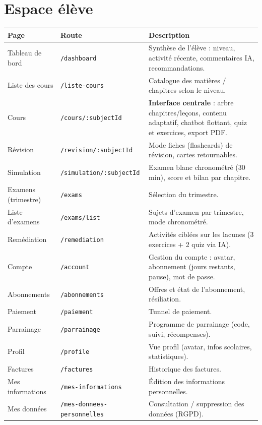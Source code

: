 \section{Espace élève}
\begin{longtable}{p{3.2cm}p{3.2cm}p{7.8cm}}
\toprule \textbf{Page} & \textbf{Route} & \textbf{Description} \\ \midrule \endhead
Tableau de bord & \texttt{/dashboard} & Synthèse de l'élève : niveau, activité récente, commentaires IA, recommandations. \\
Liste des cours & \texttt{/liste-cours} & Catalogue des matières / chapitres selon le niveau. \\
Cours & \texttt{/cours/:subjectId} & \textbf{Interface centrale} : arbre chapitres/leçons, contenu adaptatif, chatbot flottant, quiz et exercices, export PDF. \\
Révision & \texttt{/revision/:subjectId} & Mode fiches (flashcards) de révision, cartes retournables. \\
Simulation & \texttt{/simulation/:subjectId} & Examen blanc chronométré (30 min), score et bilan par chapitre. \\
Examens (trimestre) & \texttt{/exams} & Sélection du trimestre. \\
Liste d'examens & \texttt{/exams/list} & Sujets d'examen par trimestre, mode chronométré. \\
Remédiation & \texttt{/remediation} & Activités ciblées sur les lacunes (3 exercices + 2 quiz via IA). \\
Compte & \texttt{/account} & Gestion du compte : avatar, abonnement (jours restants, pause), mot de passe. \\
Abonnements & \texttt{/abonnements} & Offres et état de l'abonnement, résiliation. \\
Paiement & \texttt{/paiement} & Tunnel de paiement. \\
Parrainage & \texttt{/parrainage} & Programme de parrainage (code, suivi, récompenses). \\
Profil & \texttt{/profile} & Vue profil (avatar, infos scolaires, statistiques). \\
Factures & \texttt{/factures} & Historique des factures. \\
Mes informations & \texttt{/mes-informations} & Édition des informations personnelles. \\
Mes données & \texttt{/mes-donnees-personnelles} & Consultation / suppression des données (RGPD). \\
\bottomrule
\end{longtable}

